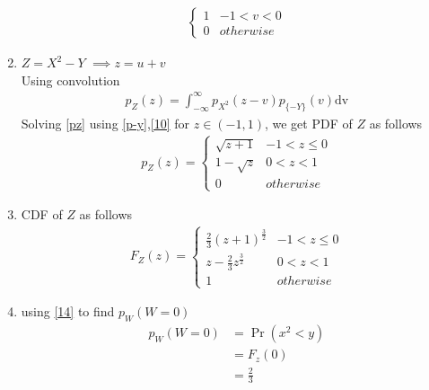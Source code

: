 \documentclass[journal,12pt,twocolumn]{IEEEtran}
\begin{document}
\begin{enumerate}
\begin{align}
\begin{cases}
      1 & -1 < v < 0 \\
      0 & otherwise
\end{cases} \label{p-y}
\end{align}
\item $Z=X^2-Y$ $\implies  z=u+v$\\
Using convolution
\begin{align}
p_Z(z)=\int_{- \infty}^{\infty} p_{X^2}(z-v)p_{\{-Y\}}(v) \mathrm{dv} \label{pz}
\end{align}
Solving \eqref{pz} using \eqref{p-y},\eqref{10} for $z \in (-1,1)$, we get PDF of $Z$ as follows
\begin{align}
p_{Z}(z)  = 
\begin{cases}
      \sqrt{z+1} & -1 < z \leq 0 \\
      1-\sqrt{z} & 0 < z <1 \\
      0 & otherwise 
\end{cases} \label{13}
\end{align}
\item CDF of $Z$ as follows
\begin{align}
F_{Z}(z)  = 
\begin{cases}
      \frac{2}{3}{(z+1)}^\frac{3}{2} & -1 < z \leq 0 \\
      z-\frac{2}{3}{z}^\frac{3}{2} & 0 < z < 1 \\
      1 & otherwise
\end{cases} \label{14}
\end{align}
\item using \eqref{14} to find $p_W(W=0)$
\begin{align}
p_W(W=0) &=\Pr(x^2 <y) \\
         &=F_z(0) \\
         &=\frac{2}{3} \label{15}
\end{align}


\end{enumerate}
\end{document}
